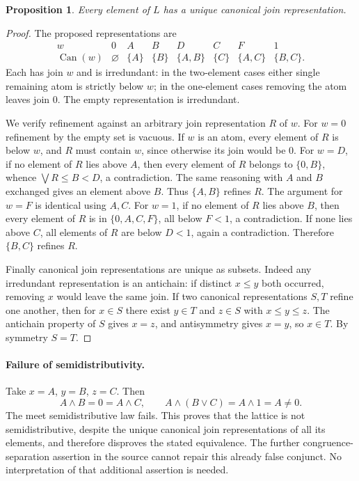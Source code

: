 \documentclass[11pt]{article}
\newtheorem{proposition}{Proposition}
\begin{document}
\begin{proposition}
Every element of $L$ has a unique canonical join representation.
\end{proposition}
\begin{proof}
The proposed representations are
\[
\begin{array}{c|ccccccc}
 w&0&A&B&D&C&F&1\\ \hline
 \operatorname{Can}(w)&\varnothing&\{A\}&\{B\}&\{A,B\}
 &\{C\}&\{A,C\}&\{B,C\}.
\end{array}
\]
Each has join $w$ and is irredundant: in the two-element cases either
single remaining atom is strictly below $w$; in the one-element cases
removing the atom leaves join $0$. The empty representation is
irredundant.

We verify refinement against an arbitrary join representation $R$ of $w$.
For $w=0$ refinement by the empty set is vacuous.
If $w$ is an atom, every element of $R$ is below $w$, and $R$ must contain
$w$, since otherwise its join would be $0$.
For $w=D$, if no element of $R$ lies above $A$, then every element of $R$
belongs to $\{0,B\}$, whence $\bigvee R\leq B<D$, a contradiction.
The same reasoning with $A$ and $B$ exchanged gives an element above $B$.
Thus $\{A,B\}$ refines $R$. The argument for $w=F$ is identical using
$A,C$.
For $w=1$, if no element of $R$ lies above $B$, then every element of $R$
is in $\{0,A,C,F\}$, all below $F<1$, a contradiction.
If none lies above $C$, all elements of $R$ are below $D<1$, again a
contradiction. Therefore $\{B,C\}$ refines $R$.

Finally canonical join representations are unique as subsets.
Indeed any irredundant representation is an antichain: if distinct
$x\leq y$ both occurred, removing $x$ would leave the same join.
If two canonical representations $S,T$ refine one another, then for
$x\in S$ there exist $y\in T$ and $z\in S$ with $x\leq y\leq z$.
The antichain property of $S$ gives $x=z$, and antisymmetry gives
$x=y$, so $x\in T$. By symmetry $S=T$.
\end{proof}

\paragraph{Failure of semidistributivity.}
Take $x=A$, $y=B$, $z=C$. Then
\[
 A\wedge B=0=A\wedge C,\qquad
 A\wedge(B\vee C)=A\wedge1=A\ne0.
\]
The meet semidistributive law fails. This proves that the lattice is not
semidistributive, despite the unique canonical join representations of
all its elements, and therefore disproves the stated equivalence.
The further congruence-separation assertion in the source cannot repair
this already false conjunct. No interpretation of that additional
assertion is needed.
\end{document}
